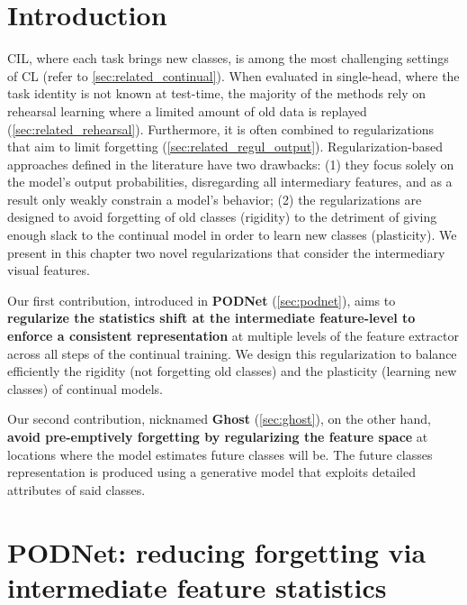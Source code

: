 \minitoc
{}


\section{Introduction}

\acf{CIL}, where each task brings new classes, is among the most challenging settings of \acf{CL}
(refer to \autoref{sec:related_continual}). When evaluated in single-head, where the task identity
is not known at test-time, the majority of the methods rely on rehearsal learning where a limited
amount of old data is replayed (\autoref{sec:related_rehearsal}). Furthermore, it is often combined
to regularizations that aim to limit forgetting (\autoref{sec:related_regul_output}).
Regularization-based approaches defined in the literature have two drawbacks: (1) they focus solely
on the model's output probabilities, disregarding all intermediary features, and as a result only
weakly constrain a model's behavior; (2) the regularizations are designed to avoid forgetting of old
classes (rigidity) to the detriment of giving enough slack to the continual model in order to learn
new classes (plasticity). We present in this chapter two novel regularizations that consider the
intermediary visual features.

Our first contribution, introduced in \textbf{PODNet} (\autoref{sec:podnet}), aims to
\textbf{regularize the statistics shift at the intermediate feature-level to enforce a consistent
    representation} at multiple levels of the feature extractor across all steps of the continual
training. We design this regularization to balance efficiently the rigidity (not forgetting old
classes) and the plasticity (learning new classes) of continual models.

Our second contribution, nicknamed \textbf{Ghost} (\autoref{sec:ghost}), on the other hand,
\textbf{avoid pre-emptively forgetting by regularizing the feature space} at locations where the
model estimates future classes will be. The future classes representation is produced using a
generative model that exploits detailed attributes of said classes.

\section{PODNet: reducing forgetting via intermediate feature statistics}
\label{sec:podnet}

